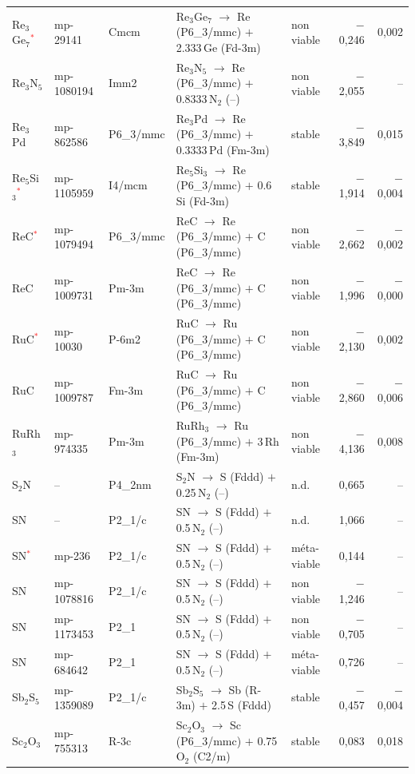 \begin{longtable}{@{}ll l@{\hspace{4pt}} p{4.6cm} l@{\hspace{4pt}} rr@{}}
Re$_{3}$Ge$_{7}$\textcolor{red}{$^*$} & mp-29141 & Cmcm & Re$_{3}$Ge$_{7}$ $\to$ Re (P6\_3/mmc) $+$ 2.333\,Ge (Fd-3m) & non viable & $-$0{,}246 & 0{,}002 \\
Re$_{3}$N$_{5}$ & mp-1080194 & Imm2 & Re$_{3}$N$_{5}$ $\to$ Re (P6\_3/mmc) $+$ 0.8333\,N$_{2}$ (--) & non viable & $-$2{,}055 & -- \\
Re$_{3}$Pd & mp-862586 & P6\_3/mmc & Re$_{3}$Pd $\to$ Re (P6\_3/mmc) $+$ 0.3333\,Pd (Fm-3m) & stable & $-$3{,}849 & 0{,}015 \\
Re$_{5}$Si$_{3}$\textcolor{red}{$^*$} & mp-1105959 & I4/mcm & Re$_{5}$Si$_{3}$ $\to$ Re (P6\_3/mmc) $+$ 0.6\,Si (Fd-3m) & stable & $-$1{,}914 & $-$0{,}004 \\
ReC\textcolor{red}{$^*$} & mp-1079494 & P6\_3/mmc & ReC $\to$ Re (P6\_3/mmc) $+$ C (P6\_3/mmc) & non viable & $-$2{,}662 & $-$0{,}002 \\
ReC & mp-1009731 & Pm-3m & ReC $\to$ Re (P6\_3/mmc) $+$ C (P6\_3/mmc) & non viable & $-$1{,}996 & $-$0{,}000 \\
RuC\textcolor{red}{$^*$} & mp-10030 & P-6m2 & RuC $\to$ Ru (P6\_3/mmc) $+$ C (P6\_3/mmc) & non viable & $-$2{,}130 & 0{,}002 \\
RuC & mp-1009787 & Fm-3m & RuC $\to$ Ru (P6\_3/mmc) $+$ C (P6\_3/mmc) & non viable & $-$2{,}860 & $-$0{,}006 \\
RuRh$_{3}$ & mp-974335 & Pm-3m & RuRh$_{3}$ $\to$ Ru (P6\_3/mmc) $+$ 3\,Rh (Fm-3m) & non viable & $-$4{,}136 & 0{,}008 \\
S$_{2}$N & -- & P4\_2nm & S$_{2}$N $\to$ S (Fddd) $+$ 0.25\,N$_{2}$ (--) & n.d. & 0{,}665 & -- \\
SN & -- & P2\_1/c & SN $\to$ S (Fddd) $+$ 0.5\,N$_{2}$ (--) & n.d. & 1{,}066 & -- \\
SN\textcolor{red}{$^*$} & mp-236 & P2\_1/c & SN $\to$ S (Fddd) $+$ 0.5\,N$_{2}$ (--) & m\'eta-viable & 0{,}144 & -- \\
SN & mp-1078816 & P2\_1/c & SN $\to$ S (Fddd) $+$ 0.5\,N$_{2}$ (--) & non viable & $-$1{,}246 & -- \\
SN & mp-1173453 & P2\_1 & SN $\to$ S (Fddd) $+$ 0.5\,N$_{2}$ (--) & non viable & $-$0{,}705 & -- \\
SN & mp-684642 & P2\_1 & SN $\to$ S (Fddd) $+$ 0.5\,N$_{2}$ (--) & m\'eta-viable & 0{,}726 & -- \\
Sb$_{2}$S$_{5}$ & mp-1359089 & P2\_1/c & Sb$_{2}$S$_{5}$ $\to$ Sb (R-3m) $+$ 2.5\,S (Fddd) & stable & $-$0{,}457 & $-$0{,}004 \\
Sc$_{2}$O$_{3}$ & mp-755313 & R-3c & Sc$_{2}$O$_{3}$ $\to$ Sc (P6\_3/mmc) $+$ 0.75\,O$_{2}$ (C2/m) & stable & 0{,}083 & 0{,}018 \\

\end{longtable}
